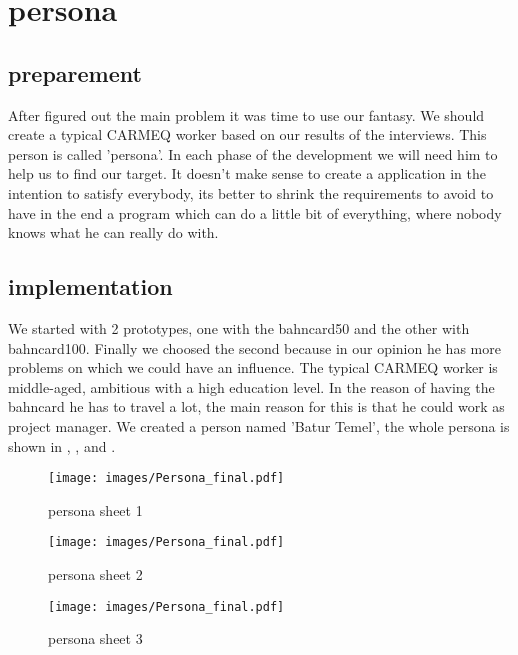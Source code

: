 
\section{persona}

\subsection{preparement}

After figured out the main problem it was time to use our fantasy. We should create a typical CARMEQ worker based on our results
of the interviews. This person is called 'persona'. In each phase of the development we will need him to help us to find our
target. It doesn't make sense to create a application in the intention to satisfy everybody, its better to shrink the requirements
to avoid to have in the end a program which can do a little bit of everything, where nobody knows what he can really do with. 

\subsection{implementation}

We started with 2 prototypes, one with the bahncard50 and the other with bahncard100. Finally we choosed the second because in our
opinion he has more problems on which we could have an influence. The typical CARMEQ worker is middle-aged, ambitious with a
high education level. In the reason of having the bahncard he has to travel a lot, the main reason for this is that he could work
as project manager.  We created a person named 'Batur Temel', the whole persona is shown in , 
,   and  .

\clearpage

\begin{figure}[!h]
	\texttt{[image: images/Persona\_final.pdf]}
	\caption{persona sheet 1}
	\label{fig:persona1}
\end{figure}

\clearpage

\begin{figure}[!h]
	\texttt{[image: images/Persona\_final.pdf]}
	\caption{persona sheet 2}
	\label{fig:persona2}
\end{figure}

\clearpage

\begin{figure}[!h]
	\texttt{[image: images/Persona\_final.pdf]}
	\caption{persona sheet 3}
	\label{fig:persona3}
\end{figure}

